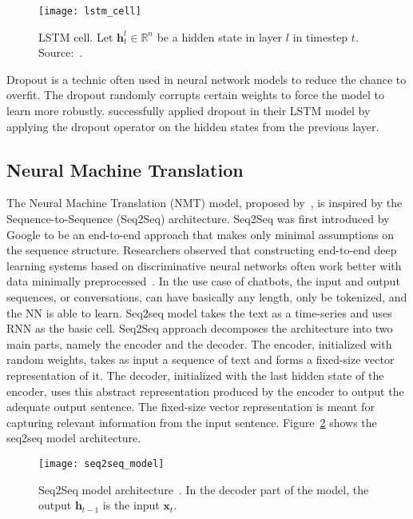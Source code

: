 \begin{figure}
    \centering
    \texttt{[image: lstm\_cell]}
    \decoRule
    \caption[LSTM cell]{LSTM cell. Let $\bm{h}^l_t \in \mathbb{R}^n$ be a hidden state in layer $l$ in timestep $t$. Source:~\citet{1409.2329}.}
    \label{fig:lstm-cell}
\end{figure}

Dropout \citep{srivastava2014dropout} is a technic often used in neural network models to reduce the chance to overfit. The dropout randomly corrupts certain weights to force the model to learn more robustly. \citet{1409.2329} successfully applied dropout in their LSTM model by applying the dropout operator on the hidden states from the previous layer.

\subsection{Neural Machine Translation}
The Neural Machine Translation (NMT) model, proposed by~\citet{nmt-phd}, is inspired by the Sequence-to-Sequence (Seq2Seq) architecture. Seq2Seq was first introduced by Google \citep{1409.3215} to be an end-to-end approach that makes only minimal assumptions on the sequence structure.
Researchers observed that constructing end-to-end deep learning systems based on discriminative neural networks often work better with data minimally preprocessed~\citep{chen2015handbook}.
In the use case of chatbots, the input and output sequences, or conversations, can have basically any length, only be tokenized, and the NN is able to learn. Seq2seq model takes the text as a time-series and uses RNN as the basic cell. Seq2Seq approach decomposes the architecture into two main parts, namely the encoder and the decoder. The encoder, initialized with random weights, takes as input a sequence of text and forms a fixed-size vector representation of it.
The decoder, initialized with the last hidden state of the encoder, uses this abstract representation produced by the encoder to output the adequate output sentence. The fixed-size vector representation is meant for capturing relevant information from the input sentence.
Figure~\ref{fig:seq2seqmodel} shows the seq2seq model architecture.

\begin{figure}
    \centering
    \texttt{[image: seq2seq\_model]}
    \decoRule
    \caption[Seq2Seq model architecture]{Seq2Seq model architecture~\citep{1409.3215}. In the decoder part of the model, the output $\bm{h}_{t-1}$ is the input $\bm{x}_{t}$.}
    \label{fig:seq2seqmodel}
\end{figure}

